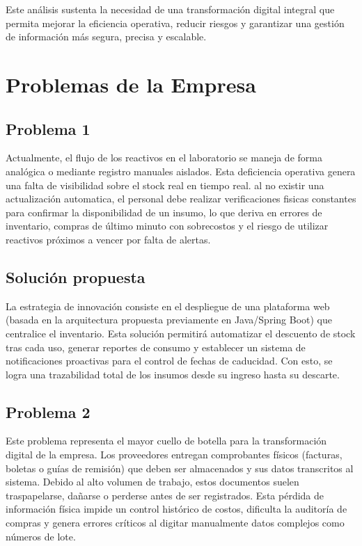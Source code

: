 \documentclass[12pt,a4paper]{article}
\begin{document}
Este análisis sustenta la necesidad de una transformación digital integral que permita mejorar la eficiencia operativa, reducir riesgos y garantizar una gestión de información más segura, precisa y escalable.


\section{Problemas de la Empresa}
\subsection{Problema 1}

Actualmente, el flujo de los reactivos en el laboratorio se maneja de forma analógica o mediante registro manuales aislados. Esta deficiencia operativa genera una falta de visibilidad sobre el stock real en tiempo real. al no existir una actualización automatica, el personal debe realizar verificaciones fisicas constantes para confirmar la disponibilidad de un insumo, lo que deriva en errores de inventario, compras de último minuto con sobrecostos y el riesgo de utilizar reactivos próximos a vencer por falta de alertas.

\subsection{Solución propuesta}

La estrategia de innovación consiste en el despliegue de una plataforma web (basada en la arquitectura propuesta previamente en Java/Spring Boot) que centralice el inventario. Esta solución permitirá automatizar el descuento de stock tras cada uso, generar reportes de consumo y establecer un sistema de notificaciones proactivas para el control de fechas de caducidad. Con esto, se logra una trazabilidad total de los insumos desde su ingreso hasta su descarte.

\subsection{Problema 2}

Este problema representa el mayor cuello de botella para la transformación digital de la empresa. Los proveedores entregan comprobantes físicos (facturas, boletas o guías de remisión) que deben ser almacenados y sus datos transcritos al sistema. Debido al alto volumen de trabajo, estos documentos suelen traspapelarse, dañarse o perderse antes de ser registrados. Esta pérdida de información física impide un control histórico de costos, dificulta la auditoría de compras y genera errores críticos al digitar manualmente datos complejos como números de lote.
\end{document}

